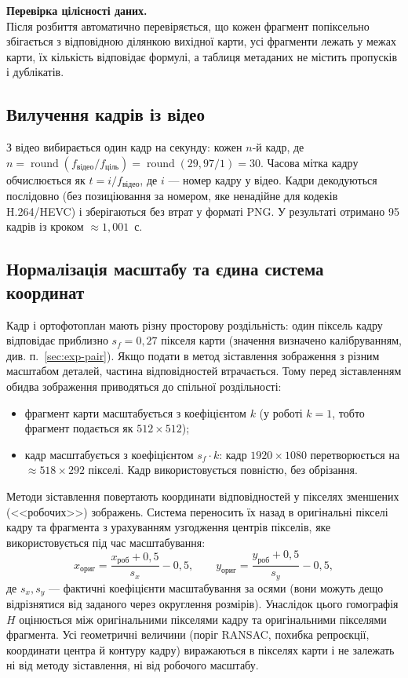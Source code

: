 \textbf{Перевірка цілісності даних.}\\
Після розбиття автоматично перевіряється, що кожен фрагмент попіксельно збігається з відповідною ділянкою вихідної карти, усі фрагменти лежать у межах карти, їх кількість відповідає формулі, а таблиця метаданих не містить пропусків і дублікатів.

\subsection{Вилучення кадрів із відео}

З відео вибирається один кадр на секунду: кожен $n$-й кадр, де $n = \operatorname{round}(f_{\text{відео}} / f_{\text{ціль}}) = \operatorname{round}(29{,}97 / 1) = 30$. Часова мітка кадру обчислюється як $t = i / f_{\text{відео}}$, де $i$ --- номер кадру у відео. Кадри декодуються послідовно (без позиціювання за номером, яке ненадійне для кодеків H.264/HEVC) і зберігаються без втрат у форматі PNG. У результаті отримано 95 кадрів із кроком $\approx 1{,}001$~с.

\subsection{Нормалізація масштабу та єдина система координат}
\label{sec:scale}

Кадр і ортофотоплан мають різну просторову роздільність: один піксель кадру відповідає приблизно $s_f = 0{,}27$ пікселя карти (значення визначено калібруванням, див. п.~\ref{sec:exp-pair}). Якщо подати в метод зіставлення зображення з різним масштабом деталей, частина відповідностей втрачається. Тому перед зіставленням обидва зображення приводяться до спільної роздільності:
\begin{itemize}
    \item фрагмент карти масштабується з коефіцієнтом $k$ (у роботі $k = 1$, тобто фрагмент подається як $512 \times 512$);
    \item кадр масштабується з коефіцієнтом $s_f \cdot k$: кадр $1920 \times 1080$ перетворюється на $\approx 518 \times 292$ пікселі. Кадр використовується повністю, без обрізання.
\end{itemize}

Методи зіставлення повертають координати відповідностей у пікселях зменшених (<<робочих>>) зображень. Система переносить їх назад в оригінальні пікселі кадру та фрагмента з урахуванням узгодження центрів пікселів, яке використовується під час масштабування:
\begin{equation}
x_{\text{ориг}} = \frac{x_{\text{роб}} + 0{,}5}{s_x} - 0{,}5, \qquad
y_{\text{ориг}} = \frac{y_{\text{роб}} + 0{,}5}{s_y} - 0{,}5,
\label{eq:backmap}
\end{equation}
де $s_x, s_y$ --- фактичні коефіцієнти масштабування за осями (вони можуть дещо відрізнятися від заданого через округлення розмірів). Унаслідок цього гомографія $H$ оцінюється між оригінальними пікселями кадру та оригінальними пікселями фрагмента. Усі геометричні величини (поріг RANSAC, похибка репроєкції, координати центра й контуру кадру) виражаються в пікселях карти і не залежать ні від методу зіставлення, ні від робочого масштабу.

